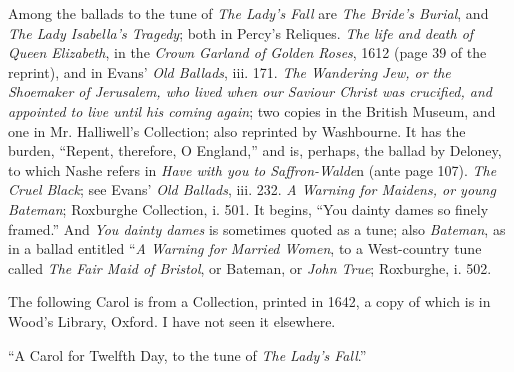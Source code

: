 Among the ballads to the tune of \textit{The Lady’s Fall} are \textit{The Bride’s Burial},
and \textit{The Lady Isabella’s Tragedy}; both in Percy’s Reliques. \textit{The life and death
of Queen Elizabeth}, in the \textit{Crown Garland of Golden Roses}, 1612 (page 39 of the
reprint), and in Evans’ \textit{Old Ballads}, iii. 171. \textit{The Wandering Jew, or the Shoemaker
of Jerusalem, who lived when our Saviour Christ was crucified, and appointed
to live until his coming again}; two copies in the British Museum, and one in
Mr. Halliwell’s Collection; also reprinted by Washbourne. It has the burden,
“Repent, therefore, O England,” and is, perhaps, the ballad by Deloney, to which
Nashe refers in \textit{Have with you to Saffron-Walde}n (ante page 107). \textit{The Cruel
Black}; see Evans’ \textit{Old Ballads}, iii. 232. \textit{A Warning for Maidens, or young
Bateman}; Roxburghe Collection, i. 501. It begins, “You dainty dames so finely
framed.” And \textit{You dainty dames} is sometimes quoted as a tune; also \textit{Bateman},
as in a ballad entitled “\textit{A Warning for Married Women}, to a West-country tune
called \textit{The Fair Maid of Bristol}, or Bateman, or \textit{John True}; Roxburghe, i. 502.

The following Carol is from a Collection, printed in 1642, a copy of which is in
Wood’s Library, Oxford. I have not seen it elsewhere.

\qquad\qquad “A Carol for Twelfth Day, to the tune of \textit{The Lady’s Fall}.”
\vspace{-0.5\baselineskip}
\settowidth{\versewidth}{Plum porridge, roast beef, and minc’d pies,}

